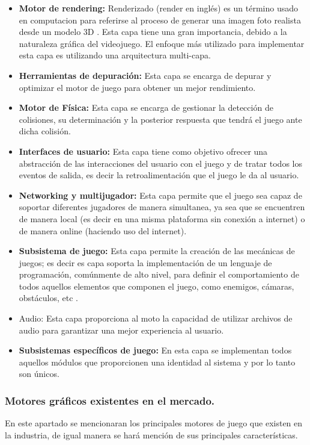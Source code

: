 \begin{itemize}
 	\item \textbf{Motor de rendering:} Renderizado (render en inglés) es un término usado en computacion para referirse al proceso de generar una imagen foto realista desde un modelo 3D \cite{Ref:Render}. Esta capa tiene una gran importancia, debido a la naturaleza gráfica del videojuego. El enfoque más utilizado para implementar esta capa es utilizando una arquitectura multi-capa\cite{Ref:ArquMotor}.
 	\item \textbf{Herramientas de depuración:} Esta capa se encarga de depurar y optimizar el motor de juego para obtener un mejor rendimiento\cite{Ref:ArquMotor}.
 	\item \textbf{Motor de Física:} Esta capa se encarga de gestionar la detección de colisiones, su determinación y la posterior respuesta que tendrá el juego ante dicha colisión.
 	\item \textbf{Interfaces de usuario:} Esta capa tiene como objetivo ofrecer una abstracción de las interacciones del usuario con el juego y de tratar todos los eventos de salida, es decir la retroalimentación que el juego le da al usuario\cite{Ref:ArquMotor}.
 	\item \textbf{Networking y multijugador:} Esta capa permite que el juego sea capaz de soportar diferentes jugadores de manera simultanea, ya sea que se encuentren de manera local (es decir en una misma plataforma sin conexión a internet) o de manera online (haciendo uso del internet)\cite{Ref:ArquMotor}.
 	\item \textbf{Subsistema de juego:} Esta capa permite la creación de las mecánicas de juegos; es decir es capa soporta la implementación de un lenguaje de programación, comúnmente de alto nivel, para definir el comportamiento de todos aquellos elementos que componen el juego, como enemigos, cámaras, obstáculos, etc \cite{Ref:ArquMotor}.
 	\item Audio: Esta capa proporciona al moto la capacidad de utilizar archivos de audio para garantizar una mejor experiencia al usuario\cite{Ref:ArquMotor}.
 	\item \textbf{Subsistemas específicos de juego:} En esta capa se implementan todos aquellos módulos que proporcionen una identidad al sistema y por lo tanto son únicos\cite{Ref:ArquMotor}.
 \end{itemize}	
 
 
 \subsubsection{Motores gráficos existentes en el mercado.}
En este apartado se mencionaran los principales motores de juego que existen en la industria, de igual manera se hará mención de sus principales características.

